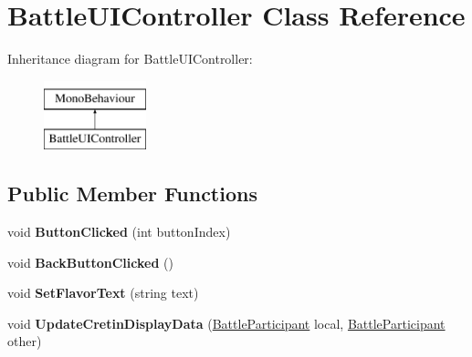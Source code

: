 \hypertarget{class_battle_u_i_controller}{\section{Battle\-U\-I\-Controller Class Reference}
\label{class_battle_u_i_controller}
}
Inheritance diagram for Battle\-U\-I\-Controller\-:\begin{figure}[H]
\begin{center}
\leavevmode
\includegraphics[height=2.000000cm]{class_battle_u_i_controller}
\end{center}
\end{figure}
\subsection*{Public Member Functions}
\begin{DoxyCompactItemize}
\item 
\hypertarget{group__client_ga3a85307f98994f49ffcb122ad836895f}{void {\bfseries Button\-Clicked} (int button\-Index)}\label{group__client_ga3a85307f98994f49ffcb122ad836895f}

\item 
\hypertarget{group__client_ga7cdd677370faa1526e0774b2b070e6fd}{void {\bfseries Back\-Button\-Clicked} ()}\label{group__client_ga7cdd677370faa1526e0774b2b070e6fd}

\item 
\hypertarget{group__client_ga05427e5dab5da5027fd3f12526e7d98c}{void {\bfseries Set\-Flavor\-Text} (string text)}\label{group__client_ga05427e5dab5da5027fd3f12526e7d98c}

\item 
\hypertarget{group__client_ga2e5edea6e65f3deca364e9750bd11e6f}{void {\bfseries Update\-Cretin\-Display\-Data} (\hyperlink{class_battle_participant}{Battle\-Participant} local, \hyperlink{class_battle_participant}{Battle\-Participant} other)}\label{group__client_ga2e5edea6e65f3deca364e9750bd11e6f}

\end{DoxyCompactItemize}
